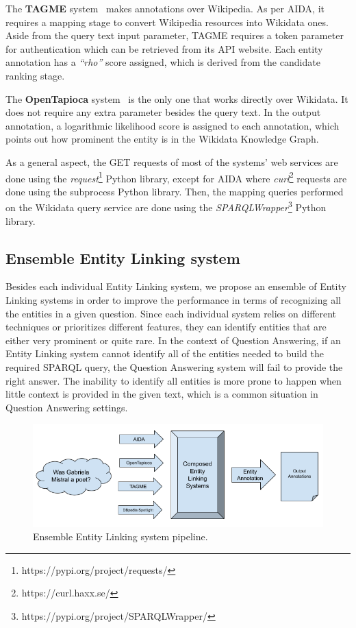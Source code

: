 The \textbf{TAGME} system~\cite{EL:tagme-FerraginaS10} makes annotations over Wikipedia. As 
per AIDA, it requires a mapping stage to convert Wikipedia resources into Wikidata ones. 
Aside from the query text input parameter, TAGME requires a token parameter for authentication 
which can be retrieved from its API website. Each entity annotation has a \textit{“rho”} score 
assigned, which is derived from the candidate ranking stage.

The \textbf{OpenTapioca} system~\cite{EL:opentapioca-Delpeuch19} is the only one that works 
directly over Wikidata. It does not require any extra parameter besides the query text. In 
the output annotation, a logarithmic likelihood score is assigned to each annotation, which 
points out how prominent the entity is in the Wikidata Knowledge Graph.

As a general aspect, the GET requests of most of the systems’ web services are done using the 
\textit{request}\footnote{https://pypi.org/project/requests/} Python library, except for AIDA 
where \textit{curl}\footnote{https://curl.haxx.se/} requests are done using the subprocess 
Python library. Then, the mapping queries performed on the Wikidata query service are done 
using the \textit{SPARQLWrapper}\footnote{https://pypi.org/project/SPARQLWrapper/} Python 
library.

\subsection{Ensemble Entity Linking system}
Besides each individual Entity Linking system, we propose an ensemble of Entity Linking systems 
in order to improve the performance in terms of recognizing all the entities in a given 
question. Since each individual system relies on different techniques or prioritizes different 
features, they can identify entities that are either very prominent or quite rare. In the 
context of Question Answering, if an Entity Linking system cannot identify all of the entities 
needed to build the required SPARQL query, the Question Answering system will fail to provide 
the right answer. The inability to identify all entities is more prone to happen when little 
context is provided in the given text, which is a common situation in Question Answering 
settings.

\begin{figure}[!h]
    \centering
    \includegraphics[scale=.45]{imagenes/3_system_overview/esembleEntityLinkingSystem.png}
    \caption{Ensemble Entity Linking system pipeline.}
    \label{fig:esembleEntityLinking}
\end{figure}

